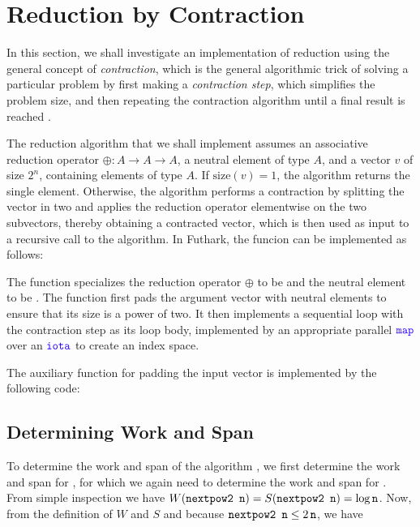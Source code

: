 \documentclass[11pt]{book}
\begin{document}
\section{Reduction by Contraction}

In this section, we shall investigate an implementation of reduction
using the general concept of \emph{contraction}, which is the general
algorithmic trick of solving a particular problem by first making a
\emph{contraction step}, which simplifies the problem size, and then
repeating the contraction algorithm until a final result is reached
\cite{algdesign:parseq2016}.

The reduction algorithm that we shall implement assumes an associative
reduction operator $\oplus : A \rightarrow A \rightarrow A$, a neutral
element of type $A$, and a vector $v$ of size $2^n$, containing
elements of type $A$. If $\mathrm{size}(v) = 1$, the algorithm returns
the single element. Otherwise, the algorithm performs a contraction by
splitting the vector in two and applies the reduction operator
elementwise on the two subvectors, thereby obtaining a contracted
vector, which is then used as input to a recursive call to the
algorithm. In Futhark, the funcion  can be implemented as
follows:



\noindent
The function specializes the reduction operator $\oplus$ to be \kw{+}
and the neutral element to be . The function first pads the
argument vector  with neutral elements to ensure that its size
is a power of two. It then implements a sequential loop with the
contraction step as its loop body, implemented by an appropriate
parallel $\fop{map}$ over an $\fop{iota}$ to create an index space.

The auxiliary function for padding the input vector is implemented by the following code:



\subsection{Determining Work and Span}

To determine the work and span of the algorithm , we first
determine the work and span for , for which we again need
to determine the work and span for . From simple
inspection we have $W(\texttt{nextpow2 n}) = S(\texttt{nextpow2 n}) =
\mathrm{log}\,\texttt{n}$. Now, from the definition of $W$ and $S$ and
because $\texttt{nextpow2 n} \leq 2\,\texttt{n}$, we have
\end{document}

